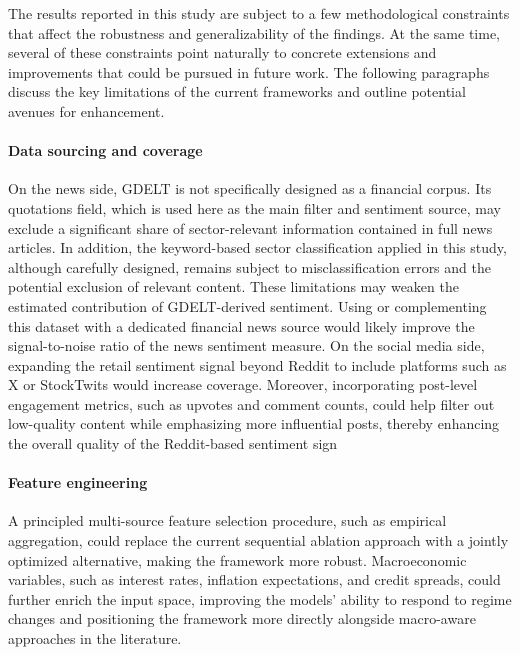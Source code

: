 The results reported in this study are subject to a few methodological constraints that affect the robustness and generalizability of the findings. At the same time, several of these constraints point naturally to concrete extensions and improvements that could be pursued in future work. The following paragraphs discuss the key limitations of the current frameworks and outline potential avenues for enhancement.

\paragraph{Data sourcing and coverage} On the news side, GDELT is not specifically designed as a financial corpus. Its quotations field, which is used here as the main filter and sentiment source, may exclude a significant share of sector-relevant information contained in full news articles. In addition, the keyword-based sector classification applied in this study, although carefully designed, remains subject to misclassification errors and the potential exclusion of relevant content. These limitations may weaken the estimated contribution of GDELT-derived sentiment. Using or complementing this dataset with a dedicated financial news source would likely improve the signal-to-noise ratio of the news sentiment measure. On the social media side, expanding the retail sentiment signal beyond Reddit to include platforms such as X or StockTwits would increase coverage. Moreover, incorporating post-level engagement metrics, such as upvotes and comment counts, could help filter out low-quality content while emphasizing more influential posts, thereby enhancing the overall quality of the Reddit-based sentiment sign

\paragraph{Feature engineering} A principled multi-source feature selection procedure, such as empirical aggregation, could replace the current sequential ablation approach with a jointly optimized alternative, making the framework more robust. Macroeconomic variables, such as interest rates, inflation expectations, and credit spreads, could further enrich the input space, improving the models' ability to respond to regime changes and positioning the framework more directly alongside macro-aware approaches in the literature.

